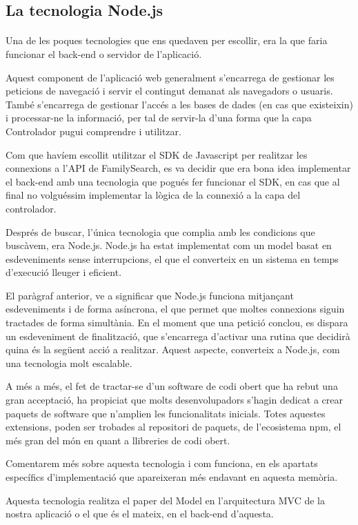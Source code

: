 \subsection{La tecnologia Node.js}

    \paragraph{}
    Una de les poques tecnologies que ens quedaven per escollir, era la que faria funcionar el back-end o servidor de l'aplicació.

    Aquest component de l'aplicació web generalment s'encarrega de gestionar les peticions de navegació i servir el contingut demanat als navegadors o usuaris. També s'encarrega de gestionar l'accés a les bases de dades (en cas que existeixin) i processar-ne la informació, per tal de servir-la d'una forma que la capa Controlador pugui comprendre i utilitzar.

    Com que havíem escollit utilitzar el SDK de Javascript per realitzar les connexions a l'API de FamilySearch, es va decidir que era bona idea implementar el back-end amb una tecnologia que pogués fer funcionar el SDK, en cas que al final no volguéssim implementar la lògica de la connexió a la capa del controlador.

    Després de buscar, l'única tecnologia que complia amb les condicions que buscàvem, era Node.js. Node.js ha estat implementat com un model basat en esdeveniments sense interrupcions, el que el converteix en un sistema en temps d'execució lleuger i eficient.

    El paràgraf anterior, ve a significar que Node.js funciona mitjançant esdeveniments i de forma asíncrona, el que permet que moltes connexions siguin tractades de forma simultània. En el moment que una petició conclou, es dispara un esdeveniment de finalització, que s'encarrega d'activar una rutina que decidirà quina és la següent acció a realitzar. Aquest aspecte, converteix a Node.js, com una tecnologia molt escalable.

    A més a més, el fet de tractar-se d'un software de codi obert que ha rebut una gran acceptació, ha propiciat que molts desenvolupadors s'hagin dedicat a crear paquets de software que n'amplien les funcionalitats inicials. Totes aquestes extensions, poden ser trobades al repositori de paquets, de l'ecosistema npm, el més gran del món en quant a llibreries de codi obert.

    Comentarem més sobre aquesta tecnologia i com funciona, en els apartats específics d'implementació que apareixeran més endavant en aquesta memòria.

    Aquesta tecnologia realitza el paper del Model en l'arquitectura MVC de la nostra aplicació o el que és el mateix, en el back-end d'aquesta.
